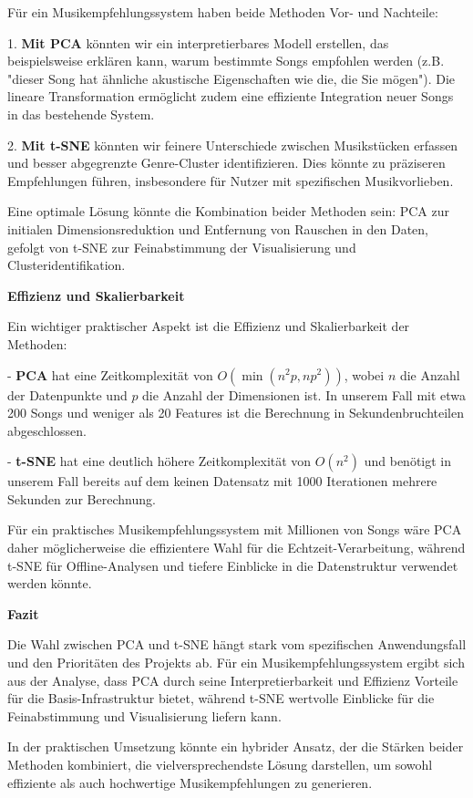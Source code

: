 Für ein Musikempfehlungssystem haben beide Methoden Vor- und Nachteile:

1. \textbf{Mit PCA} könnten wir ein interpretierbares Modell erstellen, das beispielsweise erklären kann, warum bestimmte Songs empfohlen werden (z.B. "dieser Song hat ähnliche akustische Eigenschaften wie die, die Sie mögen"). Die lineare Transformation ermöglicht zudem eine effiziente Integration neuer Songs in das bestehende System.

2. \textbf{Mit t-SNE} könnten wir feinere Unterschiede zwischen Musikstücken erfassen und besser abgegrenzte Genre-Cluster identifizieren. Dies könnte zu präziseren Empfehlungen führen, insbesondere für Nutzer mit spezifischen Musikvorlieben.

Eine optimale Lösung könnte die Kombination beider Methoden sein: PCA zur initialen Dimensionsreduktion und Entfernung von Rauschen in den Daten, gefolgt von t-SNE zur Feinabstimmung der Visualisierung und Clusteridentifikation.

\textbf{Effizienz und Skalierbarkeit}

Ein wichtiger praktischer Aspekt ist die Effizienz und Skalierbarkeit der Methoden:

- \textbf{PCA} hat eine Zeitkomplexität von \(O(\min(n^2p, np^2))\), wobei \(n\) die Anzahl der Datenpunkte und \(p\) die Anzahl der Dimensionen ist. In unserem Fall mit etwa 200 Songs und weniger als 20 Features ist die Berechnung in Sekundenbruchteilen abgeschlossen.

- \textbf{t-SNE} hat eine deutlich höhere Zeitkomplexität von \(O(n^2)\) und benötigt in unserem Fall bereits auf dem keinen Datensatz mit 1000 Iterationen mehrere Sekunden zur Berechnung.

Für ein praktisches Musikempfehlungssystem mit Millionen von Songs wäre PCA daher möglicherweise die effizientere Wahl für die Echtzeit-Verarbeitung, während t-SNE für Offline-Analysen und tiefere Einblicke in die Datenstruktur verwendet werden könnte.

\textbf{Fazit}

Die Wahl zwischen PCA und t-SNE hängt stark vom spezifischen Anwendungsfall und den Prioritäten des Projekts ab. Für ein Musikempfehlungssystem ergibt sich aus der Analyse, dass PCA durch seine Interpretierbarkeit und Effizienz Vorteile für die Basis-Infrastruktur bietet, während t-SNE wertvolle Einblicke für die Feinabstimmung und Visualisierung liefern kann.

In der praktischen Umsetzung könnte ein hybrider Ansatz, der die Stärken beider Methoden kombiniert, die vielversprechendste Lösung darstellen, um sowohl effiziente als auch hochwertige Musikempfehlungen zu generieren.
